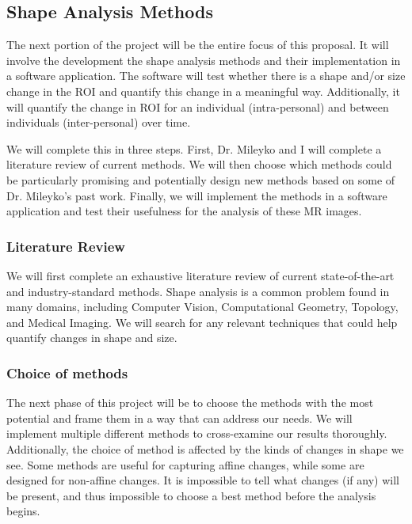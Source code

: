 \documentclass[ letterpaper, 12 pt, conference]{ieeeconf}  %
\begin{document}
\subsection{Shape Analysis Methods}

The next portion of the project will be the entire focus of this proposal.  It will involve the development the shape analysis methods and their implementation in a software application.   The software will test whether there is a shape and/or size change in the \ac{ROI} and quantify this change in a meaningful way.  Additionally, it will quantify the change in \ac{ROI} for an individual (intra-personal) and between individuals (inter-personal) over time.  

We will complete this in three steps.  First, Dr. Mileyko and I will complete a literature review of current methods.  We will then choose which methods could be particularly promising and potentially design new methods based on some of Dr. Mileyko's past work.  Finally, we will implement the methods in a software application and test their usefulness for the analysis of these MR images. 

\subsubsection{Literature Review}

We will first complete an exhaustive literature review of current state-of-the-art and industry-standard methods.   Shape analysis is a common problem found in many domains, including Computer Vision, Computational Geometry, Topology, and Medical Imaging.   We will search for any relevant techniques that could help quantify changes in shape and size.   

\subsubsection{Choice of methods}

The next phase of this project will be to choose the methods with the most potential and frame them in a way that can address our needs.  We will implement multiple different methods to cross-examine our results thoroughly.  Additionally, the choice of method is affected by the kinds of changes in shape we see.  Some methods are useful for capturing affine changes, while some are designed for non-affine changes.  It is impossible to tell what changes (if any) will be present, and thus impossible to choose a best method before the analysis begins.  
\end{document}
